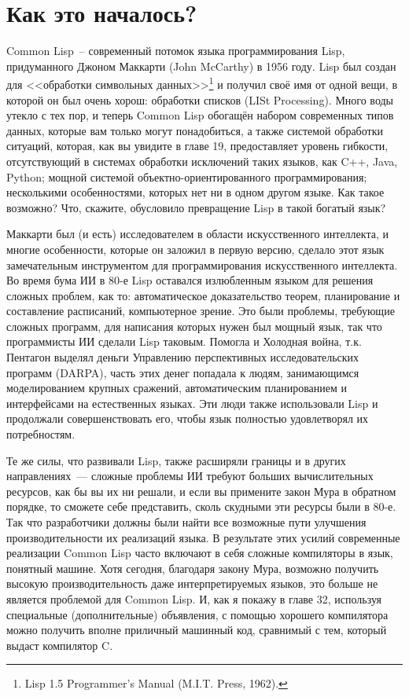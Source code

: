 \section{Как это началось?}

Common Lisp~-- современный потомок языка программирования Lisp, придуманного Джоном
Маккарти (John McCarthy) в 1956 году. Lisp был создан для <<обработки символьных
данных>>\footnote{Lisp 1.5 Programmer's Manual (M.I.T. Press, 1962).} и получил своё имя от
одной вещи, в которой он был очень хорош: обработки списков (LISt Processing). Много воды
утекло с тех пор, и теперь Common Lisp обогащён набором современных типов данных, которые
вам только могут понадобиться, а также системой обработки ситуаций, которая, как вы
увидите в главе 19, предоставляет уровень гибкости, отсутствующий в системах обработки
исключений таких языков, как C++, Java, Python; мощной системой объектно-ориентированного
программирования; несколькими особенностями, которых нет ни в одном другом языке. Как
такое возможно? Что, скажите, обусловило превращение Lisp в такой богатый язык?

Маккарти был (и есть) исследователем в области искусственного интеллекта, и многие
особенности, которые он заложил в первую версию, сделало этот язык замечательным
инструментом для программирования искусственного интеллекта. Во время бума ИИ в 80-е Lisp
оставался излюбленным языком для решения сложных проблем, как то: автоматическое
доказательство теорем, планирование и составление расписаний, компьютерное зрение. Это
были проблемы, требующие сложных программ, для написания которых нужен был мощный язык,
так что программисты ИИ сделали Lisp таковым. Помогла и Холодная война, т.к. Пентагон
выделял деньги Управлению перспективных исследовательских программ (DARPA), часть этих
денег попадала к людям, занимающимся моделированием крупных сражений, автоматическим
планированием и интерфейсами на естественных языках. Эти люди также использовали Lisp и
продолжали совершенствовать его, чтобы язык полностью удовлетворял их потребностям.

Те же силы, что развивали Lisp, также расширяли границы и в других направлениях~---
сложные проблемы ИИ требуют больших вычислительных ресурсов, как бы вы их ни решали, и
если вы примените закон Мура в обратном порядке, то сможете себе представить, сколь
скудными эти ресурсы были в 80-е. Так что разработчики должны были найти все возможные
пути улучшения производительности их реализаций языка. В результате этих усилий
современные реализации Common Lisp часто включают в себя сложные компиляторы в язык,
понятный машине. Хотя сегодня, благодаря закону Мура, возможно получить высокую
производительность даже интерпретируемых языков, это больше не является проблемой для
Common Lisp. И, как я покажу в главе 32, используя специальные (дополнительные)
объявления, с помощью хорошего компилятора можно получить вполне приличный машинный код,
сравнимый с тем, который выдаст компилятор C.

